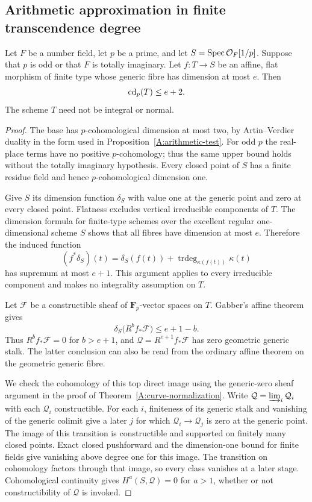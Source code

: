\subsection{Arithmetic approximation in finite transcendence degree}

\begin{lemma}
\label{A:arithmetic-affine-relative}
Let $F$ be a number field, let $p$ be a prime, and let
$S=\operatorname{Spec}\mathcal O_F[1/p]$. Suppose that $p$ is odd or that
$F$ is totally imaginary. Let $f:T\to S$ be an affine, flat
morphism of finite type whose generic fibre has dimension at
most $e$. Then
\[
 \operatorname{cd}_p(T)\leq e+2.
\]
The scheme $T$ need not be integral or normal.
\end{lemma}
\begin{proof}
The base has $p$-cohomological dimension at most two, by
Artin--Verdier duality in the form used in
Proposition~\ref{A:arithmetic-test}. For odd $p$ the real-place
terms have no positive $p$-cohomology; thus the same upper bound
holds without the totally imaginary hypothesis. Every closed
point of $S$ has a finite residue field and hence
$p$-cohomological dimension one.

Give $S$ its dimension function $\delta_S$ with value one at
the generic point and zero at every closed point. Flatness
excludes vertical irreducible components of $T$. The dimension
formula for finite-type schemes over the excellent regular
one-dimensional scheme $S$ shows that all fibres have dimension
at most $e$. Therefore the induced function
\[
 (f^*\delta_S)(t)
 =\delta_S(f(t))+\operatorname{trdeg}_{\kappa(f(t))}\kappa(t)
\]
has supremum at most $e+1$. This argument applies to every
irreducible component and makes no integrality assumption on $T$.

Let $\mathcal F$ be a constructible sheaf of
$\mathbf F_p$-vector spaces on $T$. Gabber's affine theorem
\citep[Expos\'e XV, Theorem 1.1.2 and its reformulation 1.2.1,
p.~219]{A_ILO2014} gives
\[
 \delta_S\bigl(R^b f_*\mathcal F\bigr)\leq e+1-b.
\]
Thus $R^b f_*\mathcal F=0$ for $b>e+1$, and
$\mathcal Q=R^{e+1}f_*\mathcal F$ has zero geometric generic
stalk. The latter conclusion can also be read from the ordinary
affine theorem on the geometric generic fibre.

We check the cohomology of this top direct image using the
generic-zero sheaf argument in the proof of
Theorem~\ref{A:curve-normalization}. Write
$\mathcal Q=\varinjlim_i\mathcal Q_i$ with each
$\mathcal Q_i$ constructible. For each $i$, finiteness of its
generic stalk and vanishing of the generic colimit give a later
$j$ for which $\mathcal Q_i\to\mathcal Q_j$ is zero at the
generic point. The image of this transition is constructible
and supported on finitely many closed points. Exact closed
pushforward and the dimension-one bound for finite fields give
vanishing above degree one for this image. The transition on
cohomology factors through that image, so every class vanishes
at a later stage. Cohomological continuity gives
$H^a(S,\mathcal Q)=0$ for $a>1$, whether or not constructibility
of $\mathcal Q$ is invoked.


\end{proof}
